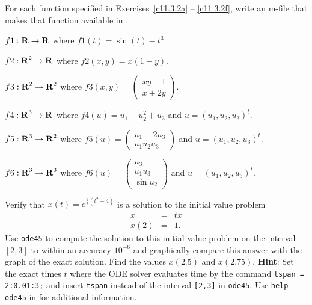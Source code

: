 \documentclass{ximera}
\begin{document}
\noindent For each function specified in Exercises~\ref{c11.3.2a} -- 
\ref{c11.3.2f}, write an m-file that makes that function available in 
\Matlabp.
\begin{exercise} \label{c11.3.2a}
$f1:\mbox{$\bf{R}$}\to\mbox{$\bf{R}$}$ where $f1(t)=\sin(t) - t^3$.
\end{exercise}
\begin{exercise} \label{c11.3.2b}
$f2:\mbox{$\bf{R}$}^2\to\mbox{$\bf{R}$}$ where $f2(x,y)=x(1-y)$.
\end{exercise}
\begin{exercise} \label{c11.3.2c}
$f3:\mbox{$\bf{R}$}^2\to\mbox{$\bf{R}$}^2$ where  
$f3(x,y)=\left(\begin{array}{c} xy-1\\x+2y\end{array}\right)$.
\end{exercise}
\begin{exercise} \label{c11.3.2d}
$f4:\mbox{$\bf{R}$}^3\to\mbox{$\bf{R}$}$ where $f4(u)=u_1-u_2^2 + u_3$ and $u=(u_1,u_2,u_3)^t$.
\end{exercise}
\begin{exercise} \label{c11.3.2e}
$f5:\mbox{$\bf{R}$}^3\to\mbox{$\bf{R}$}^2$ where $f5(u)=\left(\begin{array}{c} u_1 -2u_3\\u_1 u_2 u_3\end{array}\right)$ and $u=(u_1,u_2,u_3)^t$.
\end{exercise}
\begin{exercise} \label{c11.3.2f}
$f6:\mbox{$\bf{R}$}^3\to\mbox{$\bf{R}$}^3$ where $f6(u)=\left(\begin{array}{c} u_3\\u_1 u_3\\ 
\sin u_2\end{array}\right)$ and $u=(u_1,u_2,u_3)^t$.
\end{exercise}

\begin{exercise} \label{c11.3.2A}
Verify that $x(t) = e^{\frac{1}{2}(t^2-4)}$ is a solution to the initial 
value problem
\[
\begin{array}{rcl}
\dot{x} & = & tx \\
x(2) & = & 1.
\end{array}
\]
Use {\tt ode45} to compute the solution to this initial value problem on the
interval $[2,3]$ to within an accuracy $10^{-6}$ and graphically compare this 
answer with the graph of the exact solution.  Find the values $x(2.5)$ and
$x(2.75)$.  {\bf Hint}: Set the exact times $t$ where the ODE solver 
evaluates time by the command {\tt tspan = 2:0.01:3;} and insert {\tt tspan}
instead of the interval {\tt [2,3]} in {\tt ode45}.  Use {\tt help ode45} in 
\Matlab for additional information. 
\end{exercise}
\end{document}
